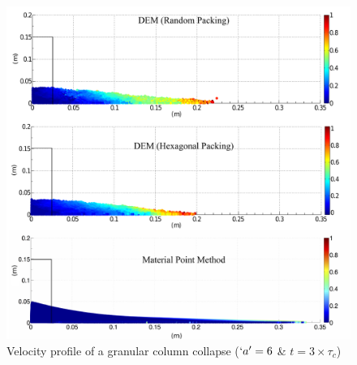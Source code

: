 \begin{figure}[tbhp]
\centering
\includegraphics[width=\textwidth]{a6f}
\caption{Velocity profile of a granular column collapse ($`a' = 6$ \& 
$t=3\times\tau_c$)}
\label{fig:a6f}
\end{figure}



